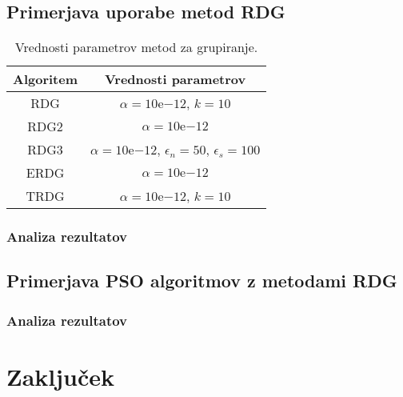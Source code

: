 
\section{Primerjava uporabe metod RDG}


\begin{table}[t]
    \centering
    \caption{Vrednosti parametrov metod za grupiranje.} \label{tab:algs:group_params}
    \begin{tabular}{|c|c|}
        \hline
        Algoritem & Vrednosti parametrov \\\hline
        RDG & $\alpha = 10\mathrm{e}{-12}$, $k = 10$ \\\hline
        RDG2 & $\alpha = 10\mathrm{e}{-12}$ \\\hline
        RDG3 & $\alpha = 10\mathrm{e}{-12}$, $\epsilon_n = 50$, $\epsilon_s = 100$ \\\hline
        ERDG & $\alpha = 10\mathrm{e}{-12}$ \\\hline
        TRDG & $\alpha = 10\mathrm{e}{-12}$, $k = 10$ \\\hline
    \end{tabular}
\end{table}


\subsection{Analiza rezultatov}


\section{Primerjava PSO algoritmov z metodami RDG}


\subsection{Analiza rezultatov}


\chapter{Zaključek}\label{chap:end}

